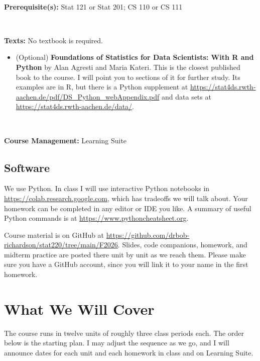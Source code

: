 \documentclass[11pt]{article}
\begin{document}
~

\textbf{Prerequisite(s):} Stat 121 or Stat 201; CS 110 or CS 111

~

\textbf{\large Texts:} No textbook is required.

\begin{itemize}[topsep=2pt,itemsep=1pt]
\item (Optional) \textbf{Foundations of Statistics for Data Scientists: With R and Python} by
  Alan Agresti and Maria Kateri. This is the closest published book to the course. I will point
  you to sections of it for further study. Its examples are in R, but there is a Python supplement
  at \url{https://stat4ds.rwth-aachen.de/pdf/DS_Python_webAppendix.pdf} and data sets at
  \url{https://stat4ds.rwth-aachen.de/data/}.
\end{itemize}

~

\textbf{Course Management:} Learning Suite

\subsection*{Software}

We use Python. In class I will use interactive Python notebooks in
\url{https://colab.research.google.com}, which has tradeoffs we will talk about. Your homework can
be completed in any editor or IDE you like. A summary of useful Python commands is at
\url{https://www.pythoncheatsheet.org}.

Course material is on GitHub at
\url{https://github.com/drbob-richardson/stat220/tree/main/F2026}. Slides, code companions,
homework, and midterm practice are posted there unit by unit as we reach them. Please make sure
you have a GitHub account, since you will link it to your name in the first homework.

\section*{What We Will Cover}

The course runs in twelve units of roughly three class periods each. The order below is the
starting plan. I may adjust the sequence as we go, and I will announce dates for each unit and
each homework in class and on Learning Suite.
\end{document}
